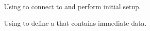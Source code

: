 \begin{figure}
  \caption{Using \libdrift to connect to \driftd and perform initial setup.}
\end{figure}


\begin{figure}
  \caption{Using \libdrift to define a \dpart that contains immediate data.}
\end{figure}



